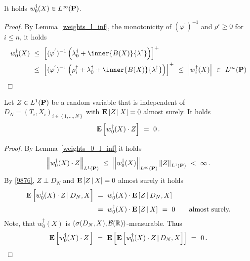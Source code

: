 \begin{lemma}
  \label{weights_0_l_inf}
  It holds $w_0^\dagger(X)\in L^\infty(\P)$.
\end{lemma}
\begin{proof}
  By Lemma~\ref{weights_l_inf},
  the monotonicity of 
  $
  (\varphi^{'})^{-1}
  $
  and $\rho^i\ge 0$ for $i\le n$,
  it holds
  \begin{align*}
    w_0^\dagger(X) 
    &
    \ 
    \le
    \ 
  \left[ 
  (\varphi^{'})^{-1}
  \left( 
    \lambda_0^\dagger
    +
    \inner
    {B(X)}
    {\lambda^\dagger}
  \right)
\right]^+
\\
&
\ 
\le
\ 
  \left[ 
  (\varphi^{'})^{-1}
  \left( 
    \rho_i^\dagger
    +
    \lambda_0^\dagger
    +
    \inner
    {B(X)}
    {\lambda^\dagger}
  \right)
\right]^+
\ 
\le
\ 
\left| 
    w_i^\dagger(X) 
\right|
\ 
\in
\ 
L^\infty(\P)
  \end{align*}
\end{proof}
\begin{lemma}
  \label{w.Z=0}
 Let 
 $Z\in L^1(\P)$
  be a random variable that is independent of $D_N=(T_i,X_i)_{i\in \left\{
    1,\ldots,N
  \right\}}$ 
  with
  $
\E
\left[
  Z
  \,
  |
  \, 
  X
\right]
= 0
  $
  almost surely.
  It holds
  \begin{gather*}
  \E
  \left[
    w_0^\dagger(X)
  \cdot Z
  \right]
  \ 
  =
  \ 
  0
  \,.
  \end{gather*}
\end{lemma}
\begin{proof}
  By Lemma~\ref{weights_0_l_inf} it holds
  \begin{gather}
    \label{9876}
    \norm{
  w_0^\dagger(X)\cdot Z
    }_{L^1(\P)}
    \ 
  \le
    \ 
  \norm{w_0^\dagger(X)}_{L^\infty(\P)}
  \norm{Z}_{L^1(\P)}
  \ 
  <
  \ 
  \infty
  \,.
  \end{gather}
  By 
  \eqref{9876},
  $Z\perp D_N$
  and
  $
\E
\left[
  Z
  \,
  |
  \, 
  X
\right]
= 0
  $
  almost surely
  it holds 
  \begin{align*}
    \E
  \left[
  w_0^\dagger(X)
  \cdot
  Z
  \,
  |
  \,
  D_N,X
  \right]
  &
  \ 
  =
  \ 
  w_0^\dagger(X)
  \cdot
  \E
  \left[
  Z
  \,
  |
  \,
  D_N,X
  \right]
  \\
  &
  \ 
  =
  \ 
  w_0^\dagger(X)
  \cdot
  \E
  \left[
  Z
  \,
  |
  \,
  X
  \right]
  \
  =
  \ 
  0
  \qquad
  \text{almost surely.}
  \end{align*}
  Note, that $w_0^\dagger(X)$ is 
  $
  \left(
  \sigma(D_N,X),\mathcal{B}(\R)
  \right)
  $-measurable.  
  Thus
  \begin{gather*}
    \E
    \left[
  w_0^\dagger(X)
  \cdot
  Z
  \,
    \right]
    \ 
    =
    \ 
    \E
    \left[
 \E
  \left[
  w_0^\dagger(X)
  \cdot
  Z
  \,
  |
  \,
  D_N,X
  \right]
    \right]
    \ 
    =
    \ 
    0
    \,.
     \end{gather*}
\end{proof}

